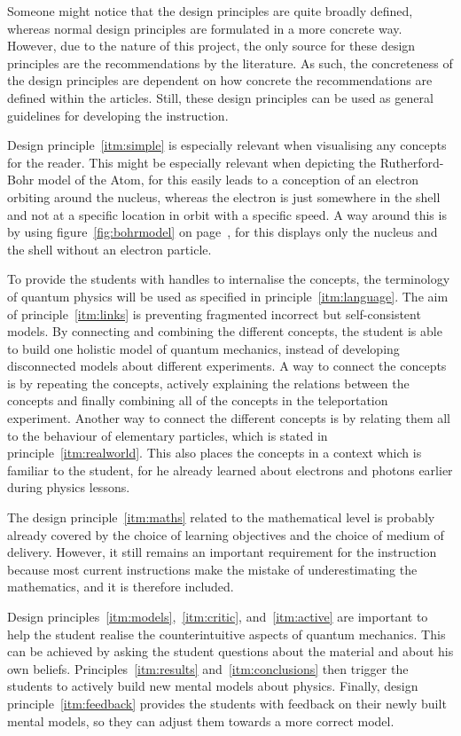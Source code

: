 \documentclass[11pt,twoside]{report} %
\begin{document}
Someone might notice that the design principles are quite broadly defined, whereas normal design principles are formulated in a more concrete way. However, due to the nature of this project, the only source for these design principles are the recommendations by the literature. As such, the concreteness of the design principles are dependent on how concrete the recommendations are defined within the articles. Still, these design principles can be used as general guidelines for developing the instruction.

Design principle~\ref{itm:simple} is especially relevant when visualising any concepts for the reader. This might be especially relevant when depicting the Rutherford-Bohr model of the Atom, for this easily leads to a conception of an electron orbiting around the nucleus, whereas the electron is just somewhere in the shell and not at a specific location in orbit with a specific speed. A way around this is by using figure~\ref{fig:bohrmodel} on page~\pageref{fig:bohrmodel}, for this displays only the nucleus and the shell without an electron particle.

To provide the students with handles to internalise the concepts, the terminology of quantum physics will be used as specified in principle~\ref{itm:language}. The aim of principle~\ref{itm:links} is preventing fragmented incorrect but self-consistent models. By connecting and combining the different concepts, the student is able to build one holistic model of quantum mechanics, instead of developing disconnected models about different experiments. A way to connect the concepts is by repeating the concepts, actively explaining  the relations between the concepts and finally combining all of the concepts in the teleportation experiment. Another way to connect the different concepts is by relating them all to the behaviour of elementary particles, which is stated in principle~\ref{itm:realworld}. This also places the concepts in a context which is familiar to the student, for he already learned about electrons and photons earlier during physics lessons.

The design principle~\ref{itm:maths} related to the mathematical level is probably already covered by the choice of learning objectives and the choice of medium of delivery. However, it still remains an important requirement for the instruction because most current instructions make the mistake of underestimating the mathematics, and it is therefore included.

Design principles~\ref{itm:models},~\ref{itm:critic}, and~\ref{itm:active} are important to help the student realise the counterintuitive aspects of quantum mechanics. This can be achieved by asking the student questions about the material and about his own beliefs. Principles~\ref{itm:results} and~\ref{itm:conclusions} then trigger the students to actively build new mental models about physics. Finally, design principle~\ref{itm:feedback} provides the students with feedback on their newly built mental models, so they can adjust them towards a more correct model.
\end{document}
